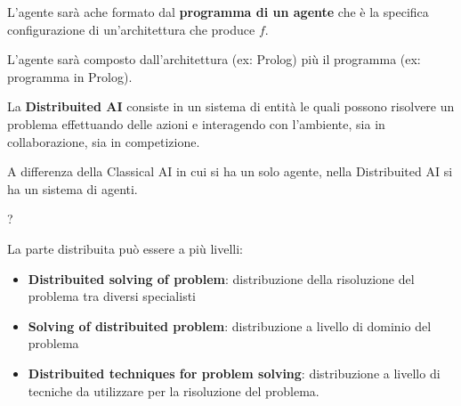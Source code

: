 L'agente sarà ache formato dal \textbf{programma di un agente} che è la specifica 
configurazione di un'architettura che produce $f$.

L'agente sarà composto dall'architettura (ex: Prolog) più il programma (ex: programma in Prolog).

\begin{definizione} 
    La \textbf{Distribuited AI} consiste in un sistema di entità le quali possono
    risolvere un problema effettuando delle azioni e interagendo con l'ambiente,
    sia in collaborazione, sia in competizione.
\end{definizione}

A differenza della Classical AI in cui si ha un solo agente, nella Distribuited AI
si ha un sistema di agenti. 

\begin{definizione} 
    ?
\end{definizione}

La parte distribuita può essere a più livelli:
\begin{itemize}
    \item \textbf{Distribuited solving of problem}: distribuzione della risoluzione
    del problema tra diversi specialisti
    \item \textbf{Solving of distribuited problem}: distribuzione a livello di dominio
    del problema
    \item \textbf{Distribuited techniques for problem solving}: distribuzione a livello
    di tecniche da utilizzare per la risoluzione del problema.
\end{itemize}




